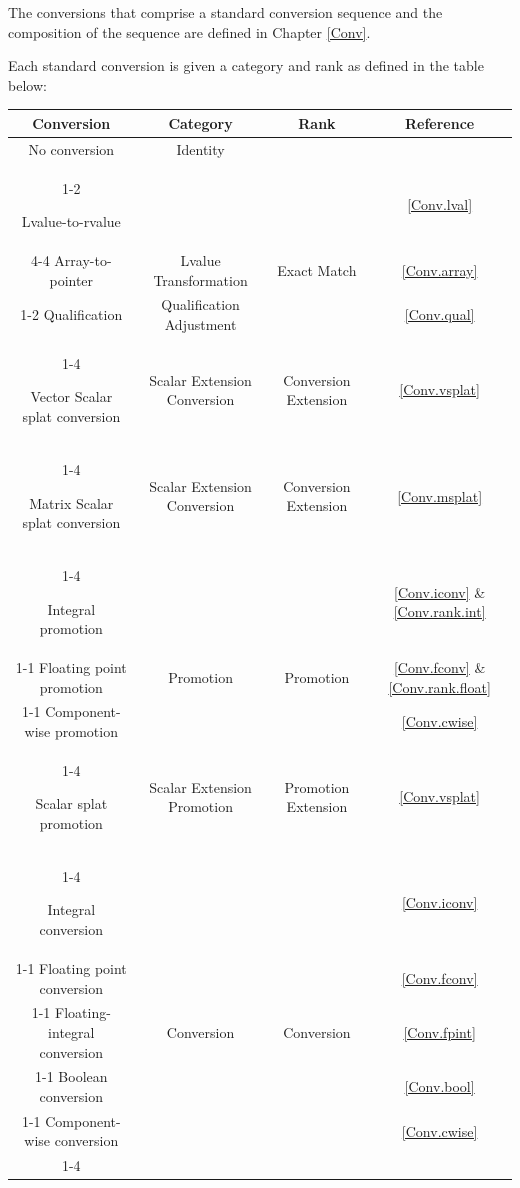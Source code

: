 
\p The conversions that comprise a standard conversion sequence and the
composition of the sequence are defined in Chapter \ref{Conv}.

\p Each standard conversion is given a category and rank as defined in the table
below:
\begin{center}
  \begin{tabular}{|| c | c | c | c ||}
    \hline
    Conversion & Category & Rank & Reference \\
    \hline
    No conversion & Identity &  & \\ \cline{1-2}\cline{4-4}

    Lvalue-to-rvalue & & & \ref{Conv.lval} \\ \cline{4-4}
    Array-to-pointer & Lvalue Transformation & Exact Match
          & \ref{Conv.array} \\ \cline{1-2}\cline{4-4}
    Qualification & Qualification Adjustment & & \ref{Conv.qual} \\ \cline{1-4}

    Vector Scalar splat conversion & Scalar Extension Conversion & Conversion Extension
      & \ref{Conv.vsplat} \\ \cline{1-4}

    Matrix Scalar splat conversion & Scalar Extension Conversion & Conversion Extension
          & \ref{Conv.msplat} \\ \cline{1-4}

    Integral promotion & &
          & \ref{Conv.iconv} \& \ref{Conv.rank.int} \\ \cline{1-1}\cline{4-4}
    Floating point promotion & Promotion & Promotion
          & \ref{Conv.fconv} \& \ref{Conv.rank.float} \\ \cline{1-1}\cline{4-4}
    Component-wise promotion &  &  & \ref{Conv.cwise} \\ \cline{1-4}

    Scalar splat promotion & Scalar Extension Promotion & Promotion Extension
          & \ref{Conv.vsplat} \\ \cline{1-4}

    Integral conversion & & & \ref{Conv.iconv} \\ \cline{1-1}\cline{4-4}
    Floating point conversion &  &  & \ref{Conv.fconv} \\ \cline{1-1}\cline{4-4}
    Floating-integral conversion & Conversion & Conversion
          & \ref{Conv.fpint} \\ \cline{1-1}\cline{4-4}
    Boolean conversion &  &  & \ref{Conv.bool} \\ \cline{1-1}\cline{4-4}
    Component-wise conversion &  &  & \ref{Conv.cwise} \\ \cline{1-4}


\end{tabular}
\end{center}
